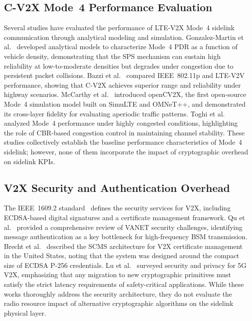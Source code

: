 \documentclass[letterpaper,journal]{IEEEtran}
\begin{document}
\subsection{C-V2X Mode~4 Performance Evaluation}

Several studies have evaluated the performance of LTE-V2X Mode~4 sidelink communication through analytical modeling and simulation. Gonzalez-Martin et al.~\cite{gonzalez2019analytical} developed analytical models to characterize Mode~4 PDR as a function of vehicle density, demonstrating that the SPS mechanism can sustain high reliability at low-to-moderate densities but degrades under congestion due to persistent packet collisions. Bazzi et al.~\cite{bazzi2017performance} compared IEEE~802.11p and LTE-V2V performance, showing that C-V2X achieves superior range and reliability under highway scenarios. McCarthy et al.~\cite{mccarthy2020opencvx} introduced openCV2X, the first open-source Mode~4 simulation model built on SimuLTE and OMNeT++, and demonstrated its cross-layer fidelity for evaluating aperiodic traffic patterns. Toghi et al.~\cite{toghi2019congestion} analyzed Mode~4 performance under highly congested conditions, highlighting the role of CBR-based congestion control in maintaining channel stability. These studies collectively establish the baseline performance characteristics of Mode~4 sidelink; however, none of them incorporate the impact of cryptographic overhead on sidelink KPIs.

\subsection{V2X Security and Authentication Overhead}

The IEEE~1609.2 standard~\cite{ieee_16092} defines the security services for V2X, including ECDSA-based digital signatures and a certificate management framework. Qu et al.~\cite{qu2015security} provided a comprehensive review of VANET security challenges, identifying message authentication as a key bottleneck for high-frequency BSM transmission. Brecht et al.~\cite{brecht2018scms} described the SCMS architecture for V2X certificate management in the United States, noting that the system was designed around the compact size of ECDSA P-256 credentials. Lu et al.~\cite{lu2018survey_v2x_security} surveyed security and privacy for 5G V2X, emphasizing that any migration to new cryptographic primitives must satisfy the strict latency requirements of safety-critical applications. While these works thoroughly address the security architecture, they do not evaluate the radio resource impact of alternative cryptographic algorithms on the sidelink physical layer.
\end{document}

